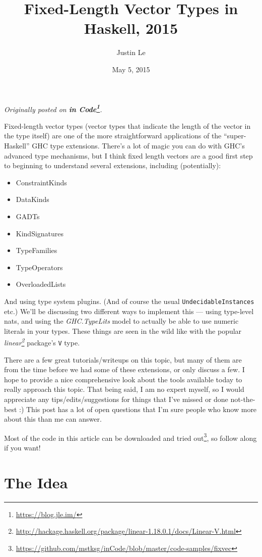 \documentclass[]{article}
\title{Fixed-Length Vector Types in Haskell, 2015}
\author{Justin Le}
\date{May 5, 2015}
\renewcommand{\href}[2]{#2\footnote{\url{#1}}}
\begin{document}
\maketitle

\emph{Originally posted on \textbf{\href{https://blog.jle.im/}{in
Code}}.}

Fixed-length vector types (vector types that indicate the length of the
vector in the type itself) are one of the more straightforward
applications of the ``super-Haskell'' GHC type extensions. There's a lot
of magic you can do with GHC's advanced type mechanisms, but I think
fixed length vectors are a good first step to beginning to understand
several extensions, including (potentially):

\begin{itemize}
\tightlist
\item
  ConstraintKinds
\item
  DataKinds
\item
  GADTs
\item
  KindSignatures
\item
  TypeFamilies
\item
  TypeOperators
\item
  OverloadedLists
\end{itemize}

And using type system plugins. (And of course the usual
\texttt{UndecidableInstances} etc.) We'll be discussing two different
ways to implement this --- using type-level nats, and using the
\emph{GHC.TypeLits} model to actually be able to use numeric literals in
your types. These things are seen in the wild like with the popular
\emph{\href{http://hackage.haskell.org/package/linear-1.18.0.1/docs/Linear-V.html}{linear}}
package's \texttt{V} type.

There are a few great tutorials/writeups on this topic, but many of them
are from the time before we had some of these extensions, or only
discuss a few. I hope to provide a nice comprehensive look about the
tools available today to really approach this topic. That being said, I
am no expert myself, so I would appreciate any tips/edits/suggestions
for things that I've missed or done not-the-best :) This post has a lot
of open questions that I'm sure people who know more about this than me
can answer.

Most of the code in this article can be
\href{https://github.com/mstksg/inCode/blob/master/code-samples/fixvec}{downloaded
and tried out}, so follow along if you want!

\section{The Idea}\label{the-idea}
\end{document}
